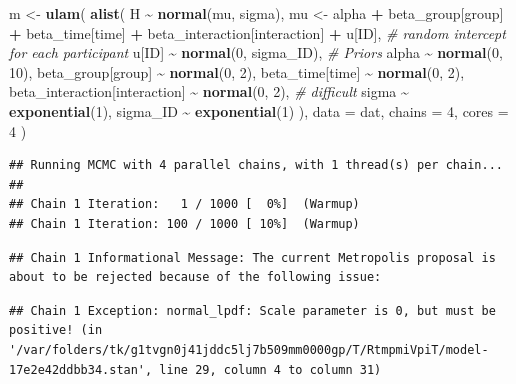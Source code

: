 \documentclass[
]{book}
\newenvironment{Shaded}{\begin{snugshade}}{\end{snugshade}}
\newcommand{\AttributeTok}[1]{\textcolor[rgb]{0.13,0.29,0.53}{#1}}
\newcommand{\CommentTok}[1]{\textcolor[rgb]{0.56,0.35,0.01}{\textit{#1}}}
\newcommand{\DecValTok}[1]{\textcolor[rgb]{0.00,0.00,0.81}{#1}}
\newcommand{\FunctionTok}[1]{\textcolor[rgb]{0.13,0.29,0.53}{\textbf{#1}}}
\newcommand{\NormalTok}[1]{#1}
\newcommand{\OtherTok}[1]{\textcolor[rgb]{0.56,0.35,0.01}{#1}}
\newcommand{\SpecialCharTok}[1]{\textcolor[rgb]{0.81,0.36,0.00}{\textbf{#1}}}
\begin{document}
\begin{Shaded}
\begin{Highlighting}[]
\NormalTok{m }\OtherTok{\textless{}{-}} \FunctionTok{ulam}\NormalTok{(}
  \FunctionTok{alist}\NormalTok{(}
\NormalTok{    H }\SpecialCharTok{\textasciitilde{}} \FunctionTok{normal}\NormalTok{(mu, sigma),}
\NormalTok{    mu }\OtherTok{\textless{}{-}}\NormalTok{ alpha }\SpecialCharTok{+}
\NormalTok{      beta\_group[group] }\SpecialCharTok{+}\NormalTok{ beta\_time[time] }\SpecialCharTok{+}\NormalTok{ beta\_interaction[interaction] }\SpecialCharTok{+}\NormalTok{ u[ID],}
    \CommentTok{\# random intercept for each participant}
\NormalTok{    u[ID] }\SpecialCharTok{\textasciitilde{}} \FunctionTok{normal}\NormalTok{(}\DecValTok{0}\NormalTok{, sigma\_ID),}
    \CommentTok{\# Priors}
\NormalTok{    alpha }\SpecialCharTok{\textasciitilde{}} \FunctionTok{normal}\NormalTok{(}\DecValTok{0}\NormalTok{, }\DecValTok{10}\NormalTok{),}
\NormalTok{    beta\_group[group] }\SpecialCharTok{\textasciitilde{}} \FunctionTok{normal}\NormalTok{(}\DecValTok{0}\NormalTok{, }\DecValTok{2}\NormalTok{),}
\NormalTok{    beta\_time[time] }\SpecialCharTok{\textasciitilde{}} \FunctionTok{normal}\NormalTok{(}\DecValTok{0}\NormalTok{, }\DecValTok{2}\NormalTok{),}
\NormalTok{    beta\_interaction[interaction] }\SpecialCharTok{\textasciitilde{}} \FunctionTok{normal}\NormalTok{(}\DecValTok{0}\NormalTok{, }\DecValTok{2}\NormalTok{), }\CommentTok{\# difficult}
\NormalTok{    sigma }\SpecialCharTok{\textasciitilde{}} \FunctionTok{exponential}\NormalTok{(}\DecValTok{1}\NormalTok{),}
\NormalTok{    sigma\_ID }\SpecialCharTok{\textasciitilde{}} \FunctionTok{exponential}\NormalTok{(}\DecValTok{1}\NormalTok{)}
\NormalTok{  ),}
  \AttributeTok{data =}\NormalTok{ dat,}
  \AttributeTok{chains =} \DecValTok{4}\NormalTok{,}
  \AttributeTok{cores =} \DecValTok{4}
\NormalTok{)}
\end{Highlighting}
\end{Shaded}

\begin{verbatim}
## Running MCMC with 4 parallel chains, with 1 thread(s) per chain...
## 
## Chain 1 Iteration:   1 / 1000 [  0%]  (Warmup) 
## Chain 1 Iteration: 100 / 1000 [ 10%]  (Warmup)
\end{verbatim}

\begin{verbatim}
## Chain 1 Informational Message: The current Metropolis proposal is about to be rejected because of the following issue:
\end{verbatim}

\begin{verbatim}
## Chain 1 Exception: normal_lpdf: Scale parameter is 0, but must be positive! (in '/var/folders/tk/g1tvgn0j41jddc5lj7b509mm0000gp/T/RtmpmiVpiT/model-17e2e42ddbb34.stan', line 29, column 4 to column 31)
\end{verbatim}
\end{document}
